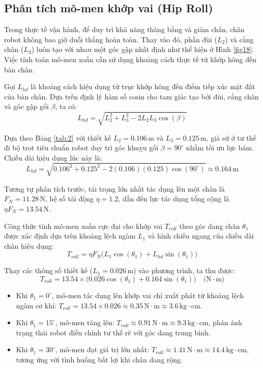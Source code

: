 \subsection{Phân tích mô-men khớp vai (Hip Roll)}

Trong thực tế vận hành, để duy trì khả năng thăng bằng và giảm chấn, chân robot không bao giờ duỗi thẳng hoàn toàn. Thay vào đó, phần đùi ($L_2$) và cẳng chân ($L_3$) luôn tạo với nhau một góc gập nhất định như thể hiện ở Hình \ref{fig18}. Việc tính toán mô-men xoắn cần sử dụng khoảng cách thực tế từ khớp hông đến bàn chân. 

Gọi $L_{hd}$ là khoảng cách hiệu dụng từ trục khớp hông đến điểm tiếp xúc mặt đất của bàn chân. Dựa trên định lý hàm số cosin cho tam giác tạo bởi đùi, cẳng chân và góc gập gối $\beta$, ta có:
\begin{equation}
    L_{hd} = \sqrt{L_2^2 + L_3^2 - 2L_2L_3\cos(\beta)}
\end{equation}

Dựa theo Bảng \ref{tab:2} với thiết kế $L_2 = 0.106\,\text{m}$ và $L_3 = 0.125\,\text{m}$, giả sử ở tư thế đi bộ trot tiêu chuẩn robot duy trì góc khuỵu gối $\beta = 90^\circ$ nhằm tối ưu lực bám. Chiều dài hiệu dụng lúc này là:
\begin{equation}
    L_{hd} = \sqrt{0.106^2 + 0.125^2 - 2(0.106)(0.125)\cos(90^\circ)} \approx 0.164\,\text{m}
\end{equation}

Tương tự phân tích trước, tải trọng lớn nhất tác dụng lên một chân là $F_N = 11.28\,\text{N}$, hệ số tải động $\eta = 1.2$, dẫn đến lực tác dụng tổng cộng là $\eta F_N = 13.54\,\text{N}$. 

Công thức tính mô-men xoắn cực đại cho khớp vai $T_{roll}$ theo góc dang chân $\theta_1$ được xác định dựa trên khoảng lệch ngàm $L_1$ và hình chiếu ngang của chiều dài chân hiệu dụng:
\begin{equation}
    T_{roll} = \eta F_N \big(L_1 \cos(\theta_1) + L_{hd} \sin(\theta_1)\big)
\end{equation}

Thay các thông số thiết kế ($L_1 = 0.026\,\text{m}$) vào phương trình, ta thu được:
\begin{equation}
    T_{roll} = 13.54 \times \big(0.026 \cos(\theta_1) + 0.164 \sin(\theta_1)\big) \quad \text{(N}\cdot\text{m)}
\end{equation}

\begin{itemize}
    \item Khi $\theta_1 = 0^\circ$, mô-men tác dụng lên khớp vai chỉ xuất phát từ khoảng lệch ngàm cơ khí: $T_{roll} = 13.54 \times 0.026 \approx 0.35\,\text{N}\cdot\text{m} \approx 3.6\,\text{kg}\cdot\text{cm}$.
    \item Khi $\theta_1 = 15^\circ$, mô-men tăng lên: $T_{roll} \approx 0.91\,\text{N}\cdot\text{m} \approx 9.3\,\text{kg}\cdot\text{cm}$, phản ánh trạng thái robot điều chỉnh tư thế rẽ với góc dang trung bình.
    \item Khi $\theta_1 = 30^\circ$, mô-men đạt giá trị lớn nhất: $T_{roll} \approx 1.41\,\text{N}\cdot\text{m} \approx 14.4\,\text{kg}\cdot\text{cm}$, tương ứng với tình huống bất lợi khi chân dang rộng.
\end{itemize}

